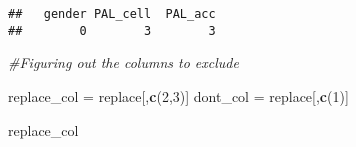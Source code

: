 \documentclass[
]{article}
\newenvironment{Shaded}{\begin{snugshade}}{\end{snugshade}}
\newcommand{\CommentTok}[1]{\textcolor[rgb]{0.56,0.35,0.01}{\textit{#1}}}
\newcommand{\DecValTok}[1]{\textcolor[rgb]{0.00,0.00,0.81}{#1}}
\newcommand{\KeywordTok}[1]{\textcolor[rgb]{0.13,0.29,0.53}{\textbf{#1}}}
\newcommand{\NormalTok}[1]{#1}
\newcommand{\StringTok}[1]{\textcolor[rgb]{0.31,0.60,0.02}{#1}}
\begin{document}
\begin{verbatim}
##   gender PAL_cell  PAL_acc 
##        0        3        3
\end{verbatim}

\begin{Shaded}
\begin{Highlighting}[]
\CommentTok{#Figuring out the columns to exclude}

\NormalTok{replace_col =}\StringTok{ }\NormalTok{replace[,}\KeywordTok{c}\NormalTok{(}\DecValTok{2}\NormalTok{,}\DecValTok{3}\NormalTok{)]}
\NormalTok{dont_col =}\StringTok{ }\NormalTok{replace[,}\KeywordTok{c}\NormalTok{(}\DecValTok{1}\NormalTok{)]}

\NormalTok{replace_col}
\end{Highlighting}
\end{Shaded}
\end{document}
